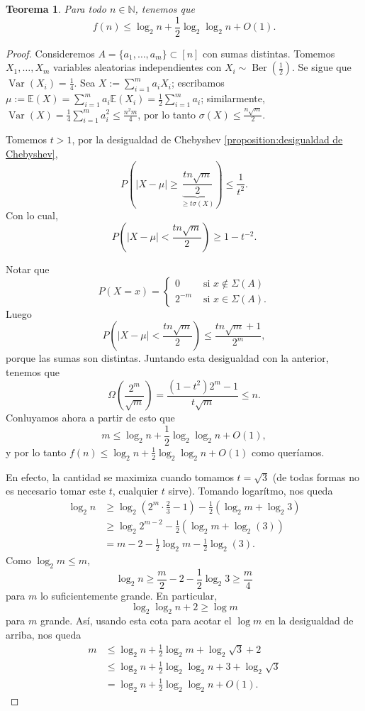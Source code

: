 \documentclass[12pt]{report}
\theoremstyle{plain}
\newtheorem{theorem}{Teorema}[section]
\theoremstyle{definition}
\newcommand{\naturals}{\mathbb{N}}
\newcommand{\abs}[1]{\left \vert #1 \right \vert}
\begin{document}
\begin{theorem}
Para todo $n \in \naturals$, tenemos que
\[
    f(n) \leq \log _2 n + \frac 1 2 \log _2 \log _2 n + O(1).
\]
\end{theorem}
\begin{proof}
Consideremos $A = \{a_1, \ldots, a_m\} \subset [n]$ con sumas distintas. Tomemos $X_1, \ldots, X_m$ variables aleatorias independientes con $X_i \sim \operatorname{Ber} (\frac 1 2)$. Se sigue que $\operatorname{Var}(X_i) = \frac 1 4$. Sea $X := \sum_{i = 1}^m a_i X_i$; escribamos $\mu := \mathbb{E} (X) = \sum_{i = 1}^m a_i \mathbb{E}(X_i) = \frac 1 2 \sum_{i = 1}^m a_i$; similarmente, $\operatorname{Var}(X) = \frac{1}{4} \sum_{i = 1}^m a_i^2 \leq \frac{n^2 m}{4}$, por lo tanto $\sigma(X) \leq \frac{n \sqrt m}{2}$.

Tomemos $t > 1$, por la desigualdad de Chebyshev \ref{proposition:desigualdad de Chebyshev},
\[
    P(\abs {X - \mu} \geq \underbrace{\frac{t n \sqrt m}{2}}_{\geq t \sigma (X)}) \leq \frac{1}{t^2}.
\]
Con lo cual,
\[
    P(\abs{X - \mu} < \frac{t n \sqrt m}{2}) \geq 1 - t^{-2}.
\]

Notar que
\[
    P(X = x) = \begin{cases}
    0 & \text{ si $x \not \in \Sigma (A)$} \\
    2^{-m} & \text{ si $x \in \Sigma (A)$}.
    \end{cases}
\]
Luego
\[
    P(\abs{X- \mu} < \frac{t n \sqrt m}{2}) \leq \frac{t n \sqrt m + 1}{2^m},
\]
porque las sumas son distintas. Juntando esta desigualdad con la anterior, tenemos que
\[
    \Omega (\frac{2^m}{\sqrt m}) = \frac{(1 - t^2) 2^m - 1}{t \sqrt m} \leq n.
\]
Conluyamos ahora a partir de esto que
\[
    m \leq \log_2 n + \frac 1 2 \log_2 \log_2 n + O(1),
\]
y por lo tanto $f(n) \leq \log _2 n + \frac 1 2 \log_2 \log_2 n + O(1)$ como queríamos.

En efecto, la cantidad se maximiza cuando tomamos $t = \sqrt 3$ (de todas formas no es necesario tomar este $t$, cualquier $t$ sirve). Tomando logarítmo, nos queda
\begin{align*}
\log_2 n &\geq \log_2 (2^m \cdot \frac 2 3 - 1) - \frac 1 2 \left ( \log_2 m + \log_2 3 \right) \\
    &\geq \log_2 2^{m-2} - \frac 1 2 \left ( \log_2 m + \log_2 (3) \right) \\
    &= m-2 - \frac 1 2 \log_2 m - \frac 1 2 \log_2 (3).
\end{align*}
Como $\log_2 m \leq m$,
\[
    \log_2 n \geq \frac m 2 - 2 - \frac 1 2 \log_2 3 \geq \frac m 4
\]
para $m$ lo suficientemente grande. En particular,
\[
    \log_2 \log_2 n + 2 \geq \log m
\]
para $m$ grande. Así, usando esta cota para acotar el $\log m$ en la desigualdad de arriba, nos queda
\begin{align*}
        m &\leq \log_2 n + \frac 1 2 \log _ 2 m + \log_2 \sqrt 3 + 2 \\
    &\leq \log_2 n + \frac 1 2 \log_2 \log_2 n + 3 + \log_2 \sqrt 3 \\
    &= \log_2 n + \frac 1 2 \log_2 \log_2 n + O(1).
\end{align*}
\end{proof}
\end{document}
